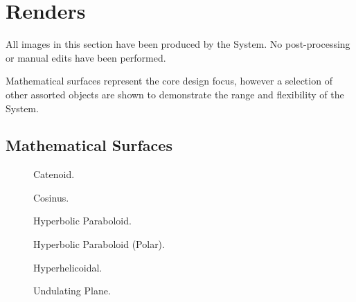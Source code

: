 \chapter{Renders}\label{appendix_renders}

All images in this section have been produced by the System. No post-processing or manual edits have been performed.

Mathematical surfaces represent the core design focus, however a selection of other assorted objects are shown to demonstrate the range and flexibility of the System.

\FloatBarrier
\section{Mathematical Surfaces}

\begin{figure}[h!]
	\centering
	
	\caption{Catenoid.}\label{render_catenoid}
\end{figure}

\begin{figure}[h!]
	\centering
	
	\caption{Cosinus.}\label{render_cosinus}
\end{figure}

\begin{figure}[h!]
	\centering
	
	\caption{Hyperbolic Paraboloid.}\label{render_hyperbolic_paraboloid}
\end{figure}

\begin{figure}[h!]
	\centering
	
	\caption{Hyperbolic Paraboloid (Polar).}\label{render_hyperbolic_paraboloid_polar}
\end{figure}

\begin{figure}[h!]
	\centering
	
	\caption{Hyperhelicoidal.}\label{render_hyperhelicoidal}
\end{figure}

\begin{figure}[h!]
	\centering
	
	\caption{Undulating Plane.}\label{render_undulating_plane}
\end{figure}

